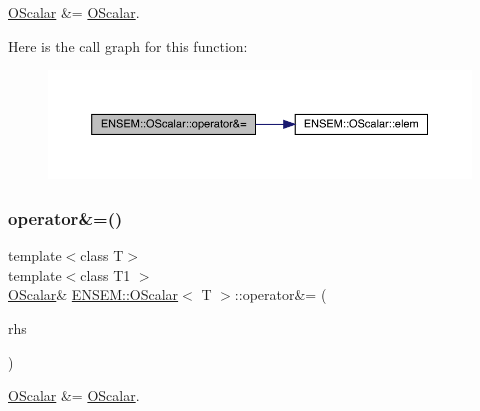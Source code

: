 \mbox{\hyperlink{classENSEM_1_1OScalar}{O\+Scalar}} \&= \mbox{\hyperlink{classENSEM_1_1OScalar}{O\+Scalar}}. 

Here is the call graph for this function\+:
\nopagebreak
\begin{figure}[H]
\begin{center}
\leavevmode
\includegraphics[width=350pt]{da/d80/classENSEM_1_1OScalar_a9a192875355f059d207c579e2514b2a3_cgraph}
\end{center}
\end{figure}
\mbox{\label{classENSEM_1_1OScalar_a9a192875355f059d207c579e2514b2a3}} 
\subsubsection{\texorpdfstring{operator\&=()}{operator\&=()}\hspace{0.1cm}{\footnotesize\ttfamily [3/3]}}
{\footnotesize\ttfamily template$<$class T$>$ \\
template$<$class T1 $>$ \\
\mbox{\hyperlink{classENSEM_1_1OScalar}{O\+Scalar}}\& \mbox{\hyperlink{classENSEM_1_1OScalar}{E\+N\+S\+E\+M\+::\+O\+Scalar}}$<$ T $>$\+::operator\&= (\begin{DoxyParamCaption}\item[{const \mbox{\hyperlink{classENSEM_1_1OScalar}{O\+Scalar}}$<$ T1 $>$ \&}]{rhs }\end{DoxyParamCaption})\hspace{0.3cm}{\ttfamily [inline]}}



\mbox{\hyperlink{classENSEM_1_1OScalar}{O\+Scalar}} \&= \mbox{\hyperlink{classENSEM_1_1OScalar}{O\+Scalar}}. 

